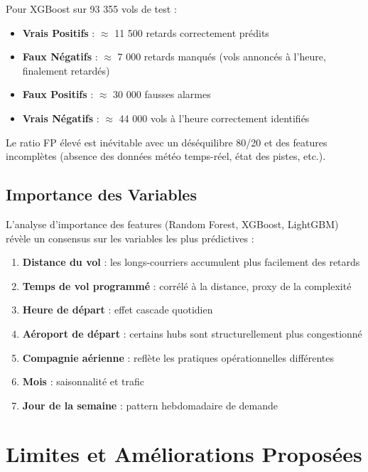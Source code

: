 \documentclass[12pt,a4paper]{article}
\begin{document}
Pour XGBoost sur 93 355 vols de test :
\begin{itemize}[leftmargin=*]
  \item \textbf{Vrais Positifs} : $\approx$ 11 500 retards correctement prédits
  \item \textbf{Faux Négatifs} : $\approx$ 7 000 retards manqués (vols annoncés à l'heure, finalement retardés)
  \item \textbf{Faux Positifs} : $\approx$ 30 000 fausses alarmes
  \item \textbf{Vrais Négatifs} : $\approx$ 44 000 vols à l'heure correctement identifiés
\end{itemize}

Le ratio FP élevé est inévitable avec un déséquilibre 80/20 et des features 
incomplètes (absence des données météo temps-réel, état des pistes, etc.).

\subsection{Importance des Variables}

L'analyse d'importance des features (Random Forest, XGBoost, LightGBM) révèle
un consensus sur les variables les plus prédictives :

\begin{enumerate}[leftmargin=*]
  \item \textbf{Distance du vol} : les longs-courriers accumulent plus facilement des retards
  \item \textbf{Temps de vol programmé} : corrélé à la distance, proxy de la complexité
  \item \textbf{Heure de départ} : effet cascade quotidien
  \item \textbf{Aéroport de départ} : certains hubs sont structurellement plus congestionné
  \item \textbf{Compagnie aérienne} : reflète les pratiques opérationnelles différentes
  \item \textbf{Mois} : saisonnalité et trafic
  \item \textbf{Jour de la semaine} : pattern hebdomadaire de demande
\end{enumerate}

\newpage
\section{Limites et Améliorations Proposées}
\end{document}
